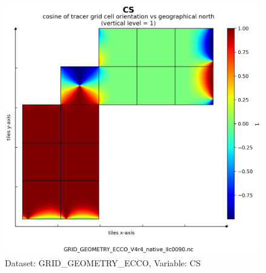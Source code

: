 \begin{figure}[H]
\centering
\includegraphics[scale=0.55]{../images/plots/v4r4/native_plots_coords/Geometry_Parameters_for_the_Lat-Lon-Cap_90_(llc90)_Native_Model_Grid_(Version_4_Release_4)/CS.png}
\caption{Dataset: GRID\_GEOMETRY\_ECCO, Variable: CS}
\label{tab:table-GRID_GEOMETRY_ECCO_CS-Plot}
\end{figure}
\newpage
\pagebreak
